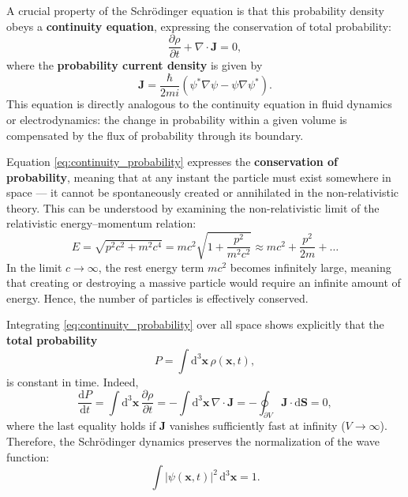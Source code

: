 A crucial property of the Schrödinger equation is that this probability density obeys a \textbf{continuity equation}, expressing the conservation of total probability:
\begin{equation}
    \frac{\partial \rho}{\partial t} + \nabla \cdot \mathbf{J} = 0,
    \label{eq:continuity_probability}
\end{equation}
where the \textbf{probability current density} is given by
\begin{equation}
    \mathbf{J} = \frac{\hbar}{2mi} \left( \psi^* \nabla \psi - \psi \nabla \psi^* \right).
    \label{eq:Schrödinger_probability_current}
\end{equation}
This equation is directly analogous to the continuity equation in fluid dynamics or electrodynamics: the change in probability within a given volume is compensated by the flux of probability through its boundary.

Equation \eqref{eq:continuity_probability} expresses the \textbf{conservation of probability}, meaning that at any instant the particle must exist somewhere in space — it cannot be spontaneously created or annihilated in the non-relativistic theory. This can be understood by examining the non-relativistic limit of the relativistic energy–momentum relation:
\[
    E = \sqrt{p^2 c^2 + m^2 c^4}
    = mc^2 \sqrt{1 + \frac{p^2}{m^2 c^2}}
    \approx mc^2 + \frac{p^2}{2m} + \dots
\]
In the limit \( c \to \infty \), the rest energy term \( mc^2 \) becomes infinitely large, meaning that creating or destroying a massive particle would require an infinite amount of energy. Hence, the number of particles is effectively conserved.

Integrating \eqref{eq:continuity_probability} over all space shows explicitly that the \textbf{total probability}
\[
    P = \int \mathrm{d}^3\mathbf{x} \, \rho(\mathbf{x},t),
\]
is constant in time. Indeed,
\[
    \frac{\mathrm{d} P}{\mathrm{d} t}
    = \int \! \mathrm{d}^3\mathbf{x} \, \frac{\partial \rho}{\partial t}
    = - \int \! \mathrm{d}^3\mathbf{x} \, \nabla \cdot \mathbf{J} = - \oint_{\partial V} \mathbf{J} \cdot \mathrm{d}\mathbf{S}
    = 0,
\]
where the last equality holds if $\mathbf{J}$ vanishes sufficiently fast at infinity (\(V \to \infty\)).
Therefore, the Schrödinger dynamics preserves the normalization of the wave function:
\[
    \int |\psi(\mathbf{x},t)|^2 \, \mathrm{d}^3\mathbf{x} = 1.
\]